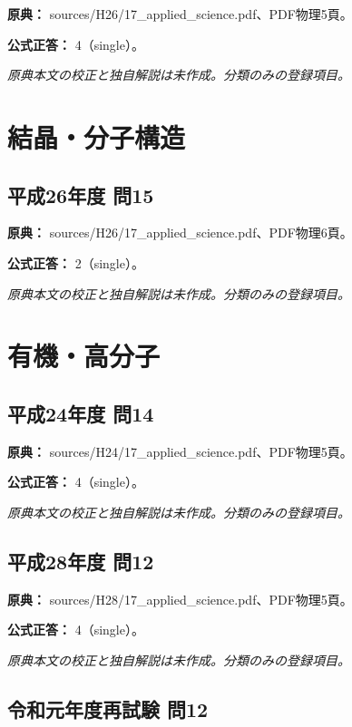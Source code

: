 \noindent\textbf{原典：} sources/H26/17\_applied\_science.pdf、PDF物理5頁。

\textbf{公式正答：} 4（single）。

\par\textit{原典本文の校正と独自解説は未作成。分類のみの登録項目。}

\section{結晶・分子構造}

\subsection{平成26年度 問15}
\label{q:h26-reg-applied-15}

\noindent\textbf{原典：} sources/H26/17\_applied\_science.pdf、PDF物理6頁。

\textbf{公式正答：} 2（single）。

\par\textit{原典本文の校正と独自解説は未作成。分類のみの登録項目。}

\section{有機・高分子}

\subsection{平成24年度 問14}
\label{q:h24-reg-applied-14}

\noindent\textbf{原典：} sources/H24/17\_applied\_science.pdf、PDF物理5頁。

\textbf{公式正答：} 4（single）。

\par\textit{原典本文の校正と独自解説は未作成。分類のみの登録項目。}

\subsection{平成28年度 問12}
\label{q:h28-reg-applied-12}

\noindent\textbf{原典：} sources/H28/17\_applied\_science.pdf、PDF物理5頁。

\textbf{公式正答：} 4（single）。

\par\textit{原典本文の校正と独自解説は未作成。分類のみの登録項目。}

\subsection{令和元年度再試験 問12}
\label{q:r01-ret-applied-12}

